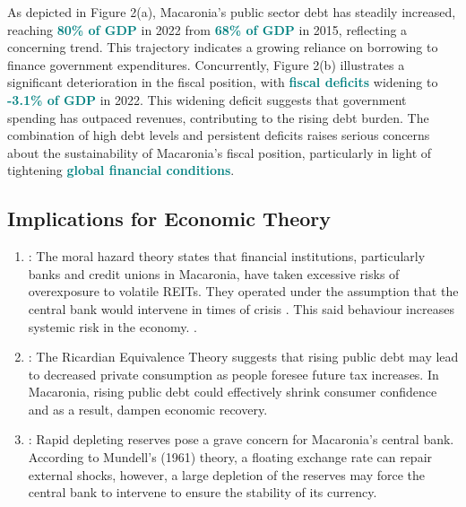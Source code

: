 As depicted in Figure 2(a), Macaronia's public sector debt has steadily increased, reaching
\textcolor{teal}{\textbf{80\% of GDP}} in 2022 from \textcolor{teal}{\textbf{68\% of GDP}} 
in 2015, reflecting a concerning trend. This trajectory indicates a growing reliance on borrowing
to finance government expenditures. Concurrently, Figure 2(b) illustrates a significant deterioration
in the fiscal position, with \textcolor{teal}{\textbf{fiscal deficits}} widening to 
\textcolor{teal}{\textbf{-3.1\% of GDP}} in 2022. This widening deficit suggests that 
government spending has outpaced revenues, contributing to the rising debt burden. 
The combination of high debt levels and persistent deficits raises serious concerns 
about the sustainability of Macaronia's fiscal position, particularly in light of tightening 
\textcolor{teal}{\textbf{global financial conditions}}.


\subsection*{Implications for Economic Theory}

\begin{enumerate}
    \item {}: The moral hazard theory states that financial
                         institutions, particularly banks and credit unions in Macaronia, have taken excessive
                         risks of overexposure to volatile REITs. They operated under the assumption that the
                         central bank would intervene in times of crisis \textcolor{orange}{\cite{holmstrom1997}}. This said
                         behaviour increases systemic risk in the economy. \textcolor{orange}{\cite{allen2015}}.

    \item {}: The Ricardian Equivalence Theory suggests that rising 
                          public debt may lead to decreased private consumption as people foresee future tax increases.
                          In Macaronia, rising public debt could effectively shrink consumer confidence and as a result,
                          dampen economic recovery.

    \item {}: Rapid depleting reserves pose a grave concern for Macaronia’s
                           central bank. According to Mundell’s (1961) theory, a floating exchange rate can repair external 
                           shocks, however, a large depletion of the reserves may force the central bank to intervene to ensure
                           the stability of its currency. \textcolor{orange}{\cite{mundell1961}}
\end{enumerate}

